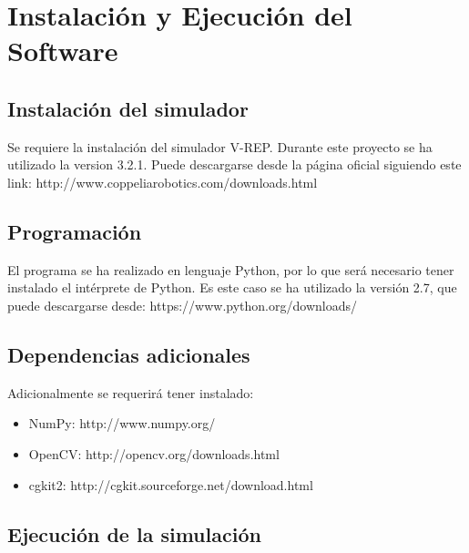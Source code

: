 \chapter{Instalación y Ejecución del Software}
\label{app:installing}

\section{Instalación del simulador}

Se requiere la instalación del simulador V-REP. Durante este proyecto se ha utilizado la version 3.2.1. Puede descargarse desde la página oficial siguiendo este link: http://www.coppeliarobotics.com/downloads.html

\section{Programación}

El programa se ha realizado en lenguaje Python, por lo que será necesario tener instalado el intérprete de Python. Es este caso se ha utilizado la versión 2.7, que puede descargarse desde: https://www.python.org/downloads/

\section{Dependencias adicionales}

Adicionalmente se requerirá tener instalado:
\begin{itemize}
	\item NumPy: http://www.numpy.org/
	\item OpenCV: http://opencv.org/downloads.html 
	\item cgkit2: http://cgkit.sourceforge.net/download.html
\end{itemize}

\section{Ejecución de la simulación}

